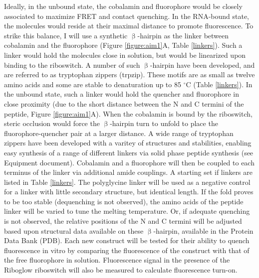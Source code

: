 Ideally, in the unbound state, the cobalamin and fluorophore would be closely associated to maximize FRET and contact quenching\cite{RosendahlSynthesisbiologicalactivity1982,ShellVitaminB12Tunable2015,ShellTunableVisibleNearIR2014}.
In the RNA-bound state, the molecules would reside at their maximal distance to promote fluorescence\cite{LeeDesignSynthesisCharacterization2009}.
To strike this balance, I will use a synthetic $\upbeta$-hairpin as the linker between cobalamin and the fluorophore (Figure \ref{figure:aim1}A, Table \ref{linkers}).
Such a linker would hold the molecules close in solution, but would be linearized upon binding to the riboswitch.
A number of such $\upbeta$-hairpin have been developed, and are referred to as tryptophan zippers (trpzip)\cite{CochranTryptophanzippersStable2001}.
These motifs are as small as twelve amino acids and some are stable to denaturation up to 85 $^\circ$C (Table \ref{linkers}).
In the unbound state, such a linker would hold the quencher and fluorophore in close proximity (due to the short distance between the N and C termini of the peptide, Figure \ref{figure:aim1}A).
When the cobalamin is bound by the riboswitch, steric occlusion would force the $\upbeta$-hairpin turn to unfold to place the fluorophore-quencher pair at a larger distance.
A wide range of tryptophan zippers have been developed with a varitey of structures and stabilities, enabling easy synthesis of a range of different linkers via solid phase peptide synthesis\cite{CochranTryptophanzippersStable2001,KierProbingLowerSize2008,AndersenMinimizationOptimizationDesigned2006,FesinmeyerEnhancedHairpinStability2004} (see Equipment document).
Cobalamin and a fluorophore will then be coupled to each terminus of the linker via additional amide couplings\cite{JackowskaVitaminB12derivatives2018}.
A starting set if linkers are listed in Table \ref{linkers}.
The polyglycine linker will be used as a negative control for a linker with little secondary structure, but identical length.
If the fold proves to be too stable (dequenching is not observed), the amino acids of the peptide linker will be varied to tune the melting temperature.
Or, if adequate quenching is not observed, the relative positions of the N and C termini will be adjusted based upon structural data available on these $\upbeta$-hairpin, available in the Protein Data Bank (PDB).
Each new construct will be tested for their ability to quench fluorescence in vitro by comparing the fluorescence of the construct with that of the free fluorophore in solution. Fluorescence signal in the presence of the Riboglow riboswitch will also be measured to calculate fluorescence turn-on.

